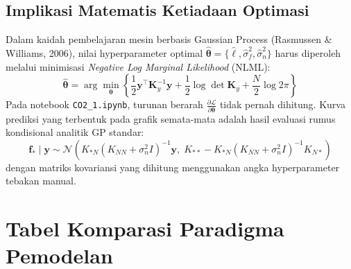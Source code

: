\documentclass[11pt,a4paper]{article}
\begin{document}
\subsection{Implikasi Matematis Ketiadaan Optimasi}
Dalam kaidah pembelajaran mesin berbasis Gaussian Process (Rasmussen \& Williams, 2006), nilai hyperparameter optimal $\hat{\boldsymbol{\theta}} = \{\hat{\ell}, \hat{\sigma}_f^2, \hat{\sigma}_n^2\}$ harus diperoleh melalui minimisasi \textit{Negative Log Marginal Likelihood} (NLML):
\begin{equation}
    \hat{\boldsymbol{\theta}} = \arg\min_{\boldsymbol{\theta}} \left\{ \frac{1}{2} \mathbf{y}^\top \mathbf{K}_y^{-1} \mathbf{y} + \frac{1}{2} \log \det \mathbf{K}_y + \frac{N}{2} \log 2\pi \right\}
\end{equation}
Pada notebook \texttt{CO2\_1.ipynb}, turunan berarah $\frac{\partial \mathcal{L}}{\partial \boldsymbol{\theta}}$ tidak pernah dihitung. Kurva prediksi yang terbentuk pada grafik semata-mata adalah hasil evaluasi rumus kondisional analitik GP standar:
\begin{equation}
    \mathbf{f}_* \mid \mathbf{y} \sim \mathcal{N}\left( K_{*N} (K_{NN} + \sigma_n^2 I)^{-1} \mathbf{y}, \; K_{**} - K_{*N}(K_{NN} + \sigma_n^2 I)^{-1} K_{N*} \right)
\end{equation}
dengan matriks kovariansi yang dihitung menggunakan angka hyperparameter tebakan manual.

\vspace{0.2cm}

\section{Tabel Komparasi Paradigma Pemodelan}
\label{sec:tabel_komparasi}
\end{document}
